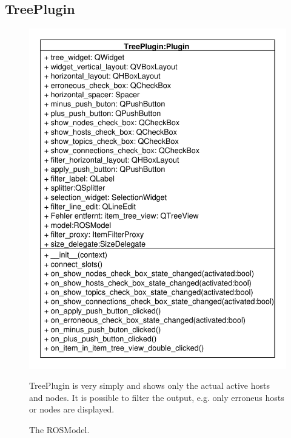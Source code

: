 \subsection{TreePlugin}
\begin{figure}[htbp]
	\begin{minipage}[t]{7cm}
		\vspace{0pt}
		\centering
		\includegraphics[scale=0.6]{./diagram_pictures/Tree.pdf}
		\caption{The ROSModel.}
	\end{minipage}
	\hfill
	\begin{minipage}[t]{5.5cm}
		\vspace{10pt}
		TreePlugin is very simply and shows only the actual active hosts
		and nodes. It is possible to filter the output, e.g. only erroneus hosts or
		nodes are displayed.
	\end{minipage}
\end{figure} 
